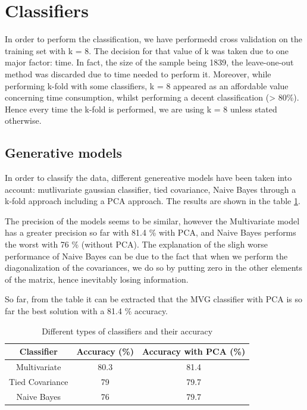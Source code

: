 \documentclass[twoside,a4paper,12pt]{report}
\begin{document}
\section{Classifiers}
In order to perform the classification, we have performedd cross validation on the 
training set with k = 8.
The decision for that value of k was taken due to one major factor: time. In fact, the size of the sample being 
1839, the leave-one-out method was discarded due to time needed to perform it.
Moreover, while performing k-fold with some classifiers, k = 8 appeared as an affordable value 
concerning time consumption, whilst performing a decent classification (> 80\%).
Hence every time the k-fold is performed, we are using k = 8 unless stated otherwise.

\subsection{Generative models}

In order to classify the data, different genereative models have been taken into account:
mutlivariate gaussian classifier, tied covariance, Naive Bayes through a k-fold approach including a PCA approach.
 The results are shown in the table \ref{diffTypesclass}. 

 The precision of the models seems to be similar, however the Multivariate  model has a
 greater precision so far with 81.4 \% with PCA, and Naive Bayes performs the worst with 76 \% (without PCA). 
 The explanation of the sligh worse performance of Naive Bayes  can be due to the fact that when we 
 perform the diagonalization of the covariances, we do so by putting zero in the other elements
  of the matrix, hence inevitably losing information. 

 So far, from the table it can be extracted that the MVG classifier with PCA is so far the best solution with
  a 81.4 \% accuracy.

\begin{table}[H]
\centering
 \begin{tabular}{||c c c||} 
    \hline \hline
    Classifier & Accuracy (\%) & Accuracy with PCA (\%)\\
    \hline\hline
    Multivariate & 80.3 & \cellcolor{blue!25} 81.4  \\ 
    \hline
    Tied Covariance & 79 & 79.7  \\
    \hline
    Naive Bayes & 76 & 79.7 \\
    \hline \hline
\end{tabular}
\caption{Different types of classifiers and their accuracy\label{diffTypesclass}
}
\end{table}
\end{document}
